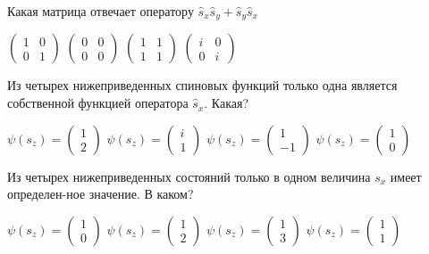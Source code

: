 \documentclass[11pt,a4paper]{exam}
\begin{document}
\begin{questions}
\question Какая матрица отвечает оператору ${\hat s_x}{\hat s_y} + {\hat s_y}{\hat s_x}$
\begin{choices}
\choice $\left( {\begin{array}{*{20}{c}}
1&0\\
0&1
\end{array}} \right)$      
\choice $\left( {\begin{array}{*{20}{c}}
0&0\\
0&0
\end{array}} \right)$      
\choice $\left( {\begin{array}{*{20}{c}}
1&1\\
1&1
\end{array}} \right)$      
\choice $\left( {\begin{array}{*{20}{c}}
i&0\\
0&i
\end{array}} \right)$
\end{choices}

\question Из четырех нижеприведенных спиновых функций только одна является собственной функцией оператора ${\hat s_x}$. Какая?
\begin{choices}
\choice $\psi ({s_z}) = \left( {\begin{array}{*{20}{c}}
1\\
2
\end{array}} \right)$   
\choice $\psi ({s_z}) = \left( {\begin{array}{*{20}{c}}
i\\
1
\end{array}} \right)$      
\choice $\psi ({s_z}) = \left( {\begin{array}{*{20}{c}}
1\\
{ - 1}
\end{array}} \right)$   
\choice $\psi ({s_z}) = \left( {\begin{array}{*{20}{c}}
1\\
0
\end{array}} \right)$
\end{choices}

\question Из четырех нижеприведенных состояний только в одном величина ${s_x}$ имеет определен-ное значение. В каком?
\begin{choices}
\choice $\psi ({s_z}) = \left( {\begin{array}{*{20}{c}}
1\\
0
\end{array}} \right)$   
\choice $\psi ({s_z}) = \left( {\begin{array}{*{20}{c}}
1\\
2
\end{array}} \right)$   
\choice $\psi ({s_z}) = \left( {\begin{array}{*{20}{c}}
1\\
3
\end{array}} \right)$   
\choice $\psi ({s_z}) = \left( {\begin{array}{*{20}{c}}
1\\
1
\end{array}} \right)$
\end{choices}


\end{questions}
\end{document}
